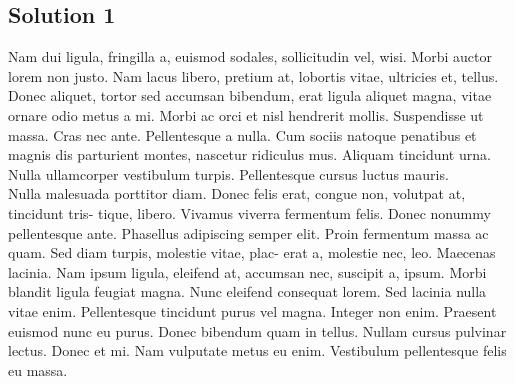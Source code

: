 \documentclass[12pt]{partialreport}
\begin{document}
\subsection*{Solution 1}
Nam dui ligula, fringilla a, euismod sodales, sollicitudin vel, wisi. Morbi auctor lorem non
justo. Nam lacus libero, pretium at, lobortis vitae, ultricies et, tellus. Donec aliquet, tortor sed
accumsan bibendum, erat ligula aliquet magna, vitae ornare odio metus a mi. Morbi ac orci et
nisl hendrerit mollis. Suspendisse ut massa. Cras nec ante. Pellentesque a nulla. Cum sociis
natoque penatibus et magnis dis parturient montes, nascetur ridiculus mus. Aliquam tincidunt
urna. Nulla ullamcorper vestibulum turpis. Pellentesque cursus luctus mauris. \\[\baselineskip] %
Nulla malesuada porttitor diam. Donec felis erat, congue non, volutpat at, tincidunt tris-
tique, libero. Vivamus viverra fermentum felis. Donec nonummy pellentesque ante. Phasellus
adipiscing semper elit. Proin fermentum massa ac quam. Sed diam turpis, molestie vitae, plac-
erat a, molestie nec, leo. Maecenas lacinia. Nam ipsum ligula, eleifend at, accumsan nec, suscipit
a, ipsum. Morbi blandit ligula feugiat magna. Nunc eleifend consequat lorem. Sed lacinia nulla
vitae enim. Pellentesque tincidunt purus vel magna. Integer non enim. Praesent euismod nunc
eu purus. Donec bibendum quam in tellus. Nullam cursus pulvinar lectus. Donec et mi. Nam
vulputate metus eu enim. Vestibulum pellentesque felis eu massa.
\end{document}
